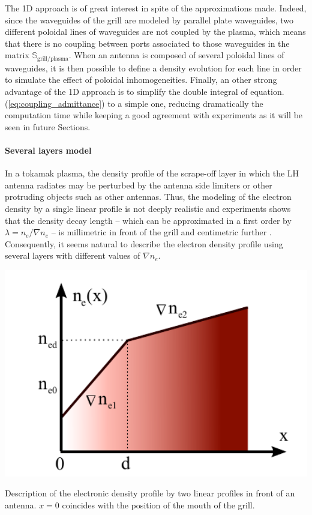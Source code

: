 The 1D approach is of great interest in spite of the approximations made. Indeed, since the waveguides of the grill are modeled by parallel plate waveguides, two different poloidal lines of waveguides are not coupled by the plasma, which means that there is no coupling between ports associated to those waveguides in the matrix $\mathbb{S}_{\mbox{grill/plasma}}$. When an antenna is composed of several poloidal lines of waveguides, it is then possible to define a density evolution for each line in order to simulate the effect of poloidal inhomogeneities. Finally, an other strong advantage of the 1D approach is to simplify the double integral of equation.(\ref{eq:coupling_admittance}) to a simple one, reducing dramatically the computation time while keeping a good agreement with experiments as it will be seen in future Sections.


\paragraph{Several layers model}\label{sec_several_layers_model}

In a tokamak plasma, the density profile of the scrape-off layer in which the LH antenna radiates may be perturbed by the antenna side limiters or other protruding objects such as other antennas. Thus, the modeling of the electron density by a single linear profile is not deeply realistic and experiments shows that the density decay length -- which can be approximated in a first order by $\lambda=n_{e}/\nabla n_{e}$  -- is millimetric in front of the grill and centimetric further . Consequently, it seems natural to describe the electron density profile using several layers with different values of $\nabla n_{e}$.

\begin{marginfigure}
	\begin{centering}
		\includegraphics[width=1.0\textwidth]{figures/chap2/ALOHA/figure3}
		\par\end{centering}
	
	\caption{Description of the electronic density profile by two linear profiles
		in front of an antenna. $x=0$ coincides with the position of the
		mouth of the grill.\label{fig:Electron-density-profile} }
	
\end{marginfigure}


